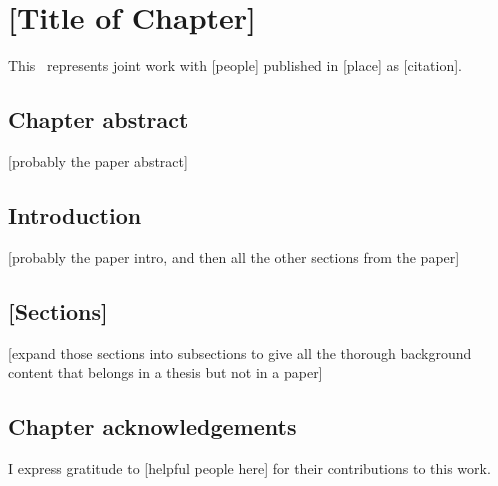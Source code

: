 \renewcommand{\chapid}{chapter}

\newcommand{\thisplain}{[insert repo name]}
\newcommand{\this}{\project{\thisplain}}
\newcommand{\license}{MIT License}
\newcommand{\Python}{\project{Python}}
\newcommand{\numpy}{\project{numpy}}
\newcommand{\Ubuntu}{\project{Ubuntu}}
\newcommand{\github}{\project{GitHub}}
\newcommand{\pip}{\project{pip}}
\newcommand{\acor}{\project{acor}}

\newcommand{\model}{\ensuremath{\vector{\Theta}}}
\newcommand{\data}{\ensuremath{\vector{D}}}
\newcommand{\nuisance}{\ensuremath{\vector{\alpha}}}
\newcommand{\link}{\ensuremath{X}}
\newcommand{\ensemble}{S}
\newcommand{\colorens}[1]{\ensemble^{(#1)}}
\newcommand{\red}{\colorens{0}}
\newcommand{\blue}{\colorens{1}}
\renewcommand{\vector}[1]{#1}
\renewcommand{\matrix}[1]{#1}

\chapter{[Title of Chapter]}

This \paper\ represents joint work with [people] published in [place] as [citation].

\section{Chapter abstract}

[probably the paper abstract]

\section{Introduction}

[probably the paper intro, and then all the other sections from the paper]

\section{[Sections]}

[expand those sections into subsections to give all the thorough background content that belongs in a thesis but not in a paper]

\section{Chapter acknowledgements}

I express gratitude to
[helpful people here]
for their contributions to this work.
